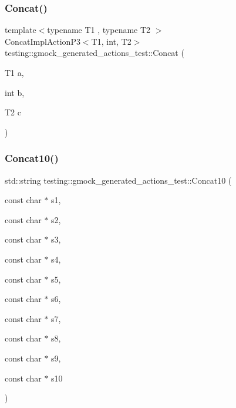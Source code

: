 \mbox{\label{namespacetesting_1_1gmock__generated__actions__test_a861e9fadbecf0c66e8226021c6c22013}} 
\subsubsection{\texorpdfstring{Concat()}{Concat()}\hspace{0.1cm}{\footnotesize\ttfamily [2/2]}}
{\footnotesize\ttfamily template$<$typename T1 , typename T2 $>$ \\
Concat\+Impl\+Action\+P3$<$T1, int, T2$>$ testing\+::gmock\+\_\+generated\+\_\+actions\+\_\+test\+::\+Concat (\begin{DoxyParamCaption}\item[{T1}]{a,  }\item[{int}]{b,  }\item[{T2}]{c }\end{DoxyParamCaption})}

\mbox{\label{namespacetesting_1_1gmock__generated__actions__test_aa3e21c9555fb8d1eafd7186d1e9b2db3}} 
\subsubsection{\texorpdfstring{Concat10()}{Concat10()}}
{\footnotesize\ttfamily std\+::string testing\+::gmock\+\_\+generated\+\_\+actions\+\_\+test\+::\+Concat10 (\begin{DoxyParamCaption}\item[{const char $\ast$}]{s1,  }\item[{const char $\ast$}]{s2,  }\item[{const char $\ast$}]{s3,  }\item[{const char $\ast$}]{s4,  }\item[{const char $\ast$}]{s5,  }\item[{const char $\ast$}]{s6,  }\item[{const char $\ast$}]{s7,  }\item[{const char $\ast$}]{s8,  }\item[{const char $\ast$}]{s9,  }\item[{const char $\ast$}]{s10 }\end{DoxyParamCaption})}

